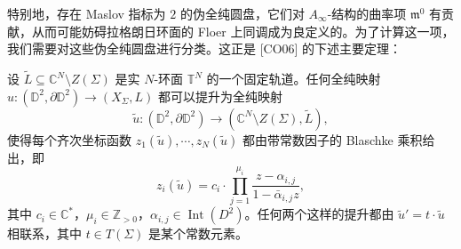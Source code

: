 
特别地，存在 Maslov 指标为 $2$ 的伪全纯圆盘，它们对 $A_{\infty}$-结构的曲率项 $\mathfrak{m}^0$ 有贡献，从而可能妨碍拉格朗日环面的 Floer 上同调成为良定义的。为了计算这一项，我们需要对这些伪全纯圆盘进行分类。这正是 [CO06] 的下述主要定理：


\begin{theorem*}[Cho--Oh '06]
设 $\tilde{L}\subseteq\mathbb{C}^N\setminus Z(\Sigma)$ 是实 $N$-环面 $\mathbb{T}^N$ 的一个固定轨道。任何全纯映射 $u\colon (\mathbb{D}^2,\partial\mathbb{D}^2)\to (X_{\Sigma},L)$ 都可以提升为全纯映射
\[
  \tilde{u}\colon (\mathbb{D}^2,\partial\mathbb{D}^2)\to (\mathbb{C}^N\setminus Z(\Sigma),\tilde{L}),
\]
使得每个齐次坐标函数 $z_1 (\tilde{u}),\dotsb, z_N (\tilde{u})$ 都由带常数因子的 Blaschke 乘积给出，即
\[
  z_i (\tilde{u})=c_i\cdot\prod_{j=1}^{\mu_i}\frac{z-\alpha_{i,j}}{1-\bar{\alpha}_{i,j} z},
\]
其中 $c_i\in\mathbb{C}^{\ast}$，$\mu_i\in\mathbb{Z}_{>0}$，$\alpha_{i,j}\in\operatorname{Int} (D^2)$。任何两个这样的提升都由 $\tilde{u}'=t\cdot\tilde{u}$ 相联系，其中 $t\in T(\Sigma)$ 是某个常数元素。
\end{theorem*}



